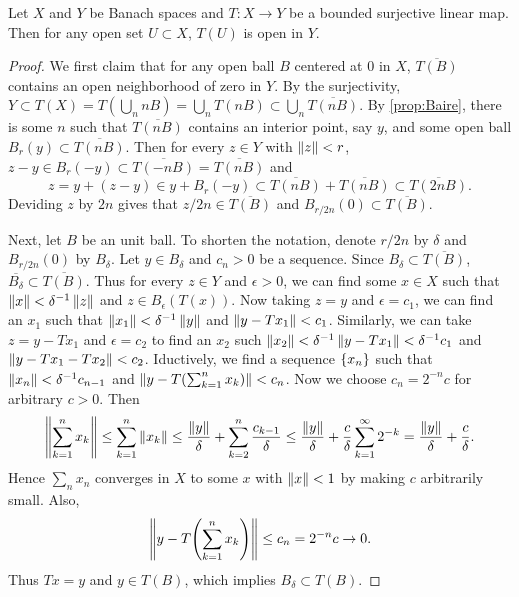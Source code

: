 \begin{theorem}
    Let $X$ and $Y$ be Banach spaces and $T:X\to Y$ be a bounded surjective linear 
    map. Then for any open set $U\subset X$, $T(U)$ is open in $Y$.
\end{theorem}
\begin{proof}
    We first claim that for any open ball $B$ centered at $0$ in $X$, $\overline{T(B)}$ 
    contains an open neighborhood of zero in $Y$. By the surjectivity, $Y\subset T(X) 
    = T(\bigcup_n nB) = \bigcup_n T(nB)\subset \bigcup_n \overline{T(nB)}$. By 
    \cref{prop:Baire}, there is some $n$ such that $\overline{T(nB)}$ contains an 
    interior point, say $y$, and some open ball $B_r(y)\subset \overline{T(nB)}$. 
    Then for every $z\in Y$ with $\left\lVert {z} \right\rVert<r$, $z-y\in B_r(-y)\subset \overline{T(-nB)} 
    = \overline{T(nB)}$ and
    \begin{equation*}
        z = y + (z-y) \in y + B_r(-y) \subset \overline{T(nB)} + \overline{T(nB)} 
        \subset \overline{T(2nB)}.
    \end{equation*}
    Deviding $z$ by $2n$ gives that $z/2n\in \overline{T(B)}$ and $B_{r/2n}(0)\subset
    \overline{T(B)}$. 

    Next, let $B$ be an unit ball. To shorten the notation, denote $r/2n$ by 
    $\delta$ and $B_{r/2n}(0)$ by $B_\delta$. Let $y\in B_\delta$ and $c_n>0$ be 
    a sequence. Since $B_\delta\subset \overline{T(B)}$, $\overline{B_\delta}
    \subset \overline{T(B)}$. Thus for every $z\in Y$ and $\epsilon>0$, we can 
    find some $x\in X$ such that $\left\lVert {x} \right\rVert<\delta^{-1}\left\lVert {z} \right\rVert$ and 
    $z\in B_\epsilon(T(x))$. Now taking $z = y$ and $\epsilon = c_1$, we can 
    find an $x_1$ such that $\left\lVert {x_1} \right\rVert<\delta^{-1}\left\lVert {y} \right\rVert$ and $\left\lVert {y-Tx_1} \right\rVert<c_1$. 
    Similarly, we can take $z = y-Tx_1$ and $\epsilon = c_2$ to find an $x_2$ such 
    $\left\lVert {x_2} \right\rVert<\delta^{-1}\left\lVert {y-Tx_1} \right\rVert<\delta^{-1}c_1$ and $\left\lVert {y-Tx_1-Tx_2} \right\rVert<c_2$. 
    Iductively, we find a sequence $\left\{ {x_n} \right\}$ such that $\left\lVert {x_n} \right\rVert<\delta^{-1}c_{n-1}$ 
    and $\norm{y-T\pth{\sum_{k=1}^n x_k}}<c_n$. Now we choose $c_n = 2^{-n}c$ for 
    arbitrary $c>0$. Then 
    \begin{equation*}
        \left\lVert {\sum_{k=1}^n x_k} \right\rVert \leq \sum_{k=1}^n \left\lVert {x_k} \right\rVert 
        \leq \frac{\left\lVert {y} \right\rVert}{\delta} + \sum_{k=2}^n \frac{c_{k-1}}{\delta} 
        \leq \frac{\left\lVert {y} \right\rVert}{\delta} + \frac{c}{\delta}\sum_{k=1}^\infty 2^{-k} 
        = \frac{\left\lVert {y} \right\rVert}{\delta} + \frac{c}{\delta}.
    \end{equation*}
    Hence $\sum_n x_n$ converges in $X$ to some $x$ with $\left\lVert {x} \right\rVert< 1$ by making 
    $c$ arbitrarily small. Also, 
    \begin{equation*}
        \norm{y-T\pth{\sum_{k=1}^n x_k}} \leq c_n = 2^{-n}c \to 0.
    \end{equation*}
    Thus $Tx = y$ and $y\in T(B)$, which implies $B_\delta\subset T(B)$. 


\end{proof}
